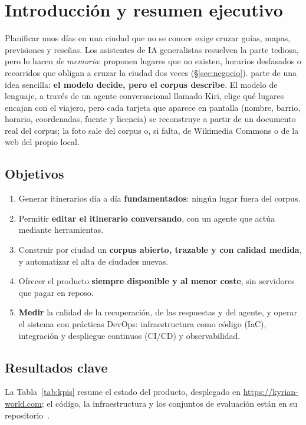 \section{Introducción y resumen ejecutivo}\label{sec:intro}

Planificar unos días en una ciudad que no se conoce exige cruzar guías, mapas, previsiones y
reseñas. Los asistentes de IA generalistas resuelven la parte tediosa, pero lo hacen
\emph{de memoria}: proponen lugares que no existen, horarios desfasados o recorridos que obligan a
cruzar la ciudad dos veces (§\ref{sec:negocio}). \kyrian{} parte de una idea sencilla:
\textbf{el modelo decide, pero el corpus describe}. El modelo de lenguaje, a través de un agente
conversacional llamado Kiri, elige qué lugares encajan con el viajero, pero cada tarjeta que aparece en pantalla (nombre, barrio, horario, coordenadas,
fuente y licencia) se reconstruye a partir de un documento real del corpus; la foto sale del
corpus o, si falta, de Wikimedia Commons o de la web del propio local.

\subsection{Objetivos}
\begin{enumerate}[label=\textbf{O\arabic*}]
  \item Generar itinerarios día a día \textbf{fundamentados}: ningún lugar fuera del corpus.
  \item Permitir \textbf{editar el itinerario conversando}, con un agente que actúa mediante herramientas.
  \item Construir por ciudad un \textbf{corpus abierto, trazable y con calidad medida}, y
        automatizar el alta de ciudades nuevas.
  \item Ofrecer el producto \textbf{siempre disponible y al menor coste}, sin servidores que pagar
        en reposo.
  \item \textbf{Medir} la calidad de la recuperación, de las respuestas y del agente, y operar el
        sistema con prácticas DevOps: infraestructura como código (IaC), integración y despliegue
        continuos (CI/CD) y observabilidad.
\end{enumerate}

\subsection{Resultados clave}
La Tabla~\ref{tab:kpis} resume el estado del producto, desplegado en
\url{https://kyrian-world.com}; el código, la infraestructura y los conjuntos de evaluación están en
su repositorio~\cite{kyrianrepo}.

